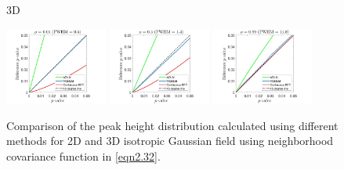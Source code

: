 \documentclass{article}
\begin{document}
\begin{figure}[!htp]
\begin{sideways}
\phantom{------------------}3D
\end{sideways}
\includegraphics[trim=80 5 80 5, clip,width=0.3\textwidth]{figure/3D_rho0.01.jpg}
\includegraphics[trim=80 5 80 5, clip,width=0.3\textwidth]{figure/3D_rho0.5.jpg}
\includegraphics[trim=80 5 80 5, clip,width=0.3\textwidth]{figure/3D_rho0.99.jpg}
\caption{Comparison of the peak height distribution calculated using different methods for 2D and 3D isotropic Gaussian field using  neighborhood covariance function in \eqref{eqn2.32}.\label{fig9}}
\end{figure}


\end{document}
